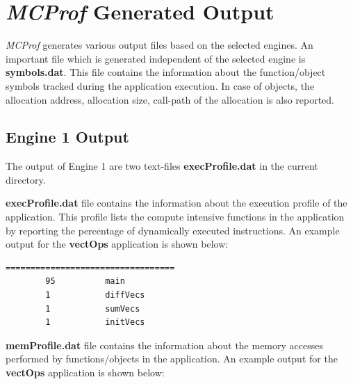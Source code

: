 \documentclass[10pt]{article}
\newcommand{\MCPROF}{\emph{MCProf}}
\begin{document}
\section{\MCPROF{} Generated Output}
\label{sec:output}

\MCPROF{} generates various output files based on the selected engines. An
important file which is generated independent of the selected engine is
\textbf{symbols.dat}.  This file contains the information about the
function/object symbols tracked during the application execution. In case of
objects, the allocation address, allocation size, call-path of the allocation is
also reported.

\subsection{Engine 1 Output}

The output of Engine 1 are two text-files \textbf{execProfile.dat} in the current
directory.

\textbf{execProfile.dat} file contains the information about the
execution profile of the application. This profile lists the compute intensive
functions in the application by reporting the percentage of dynamically executed
instructions. An example output for the \textbf{vectOps} application is shown below:

{
\scriptsize
\begin{Verbatim}[frame=single, samepage=true]
%Exec.Instr.        Function Name
==================================
        95          main
        1           diffVecs
        1           sumVecs
        1           initVecs
\end{Verbatim}
}

\textbf{memProfile.dat} file contains the information about the memory accesses
performed by functions/objects in the application. An example output for the
\textbf{vectOps} application is shown below:
\end{document}
